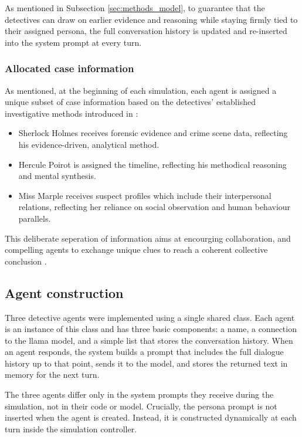 \documentclass{article}
\begin{document}
As mentioned in Subsection \ref{sec:methods_model}, to guarantee that the detectives can draw on earlier evidence and reasoning while staying firmly tied to their assigned persona, the full conversation history is updated and re-inserted into the system prompt at every turn.

\subsubsection{Allocated case information} \label{sec:methods_prompt_infopieces}

As mentioned, at the beginning of each simulation, each agent is assigned a unique subset of case information based on the detectives' established investigative methods introduced in \citet{delima2025detective}:

\begin{itemize}
    \item Sherlock Holmes receives forensic evidence and crime scene data, reflecting his evidence-driven, analytical method.
    \item Hercule Poirot is assigned the timeline, reflecting his methodical reasoning and mental synthesis.
    \item Miss Marple receives suspect profiles which include their interpersonal relations, reflecting her reliance on social observation and human behaviour parallels.
\end{itemize}

This deliberate seperation of information aims at encourging collaboration, and compelling agents to exchange unique clues to reach a coherent collective conclusion \citep{zhu2024player}. 

\subsection{Agent construction} \label{sec:methods_agent}

Three detective agents were implemented using a single shared class. Each agent is an instance of this class and has three basic components: a name, a connection to the llama model, and a simple list that stores the conversation history. When an agent responds, the system builds a prompt that includes the full dialogue history up to that point, sends it to the model, and stores the returned text in memory for the next turn.

The three agents differ only in the system prompts they receive during the simulation, not in their code or model. Crucially, the persona prompt is not inserted when the agent is created. Instead, it is constructed dynamically at each turn inside the simulation controller. 
\end{document}
